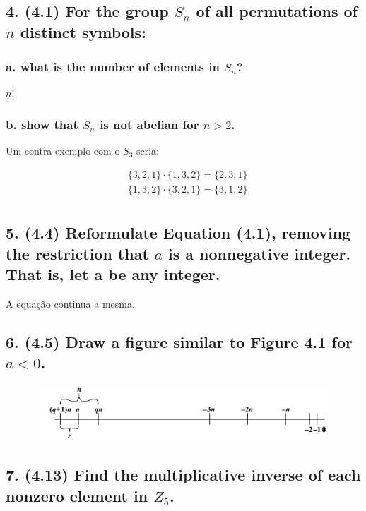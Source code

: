 \documentclass[fleqn, 12pt]{article}
\begin{document}
\subsection*{4. (4.1) For the group $S_n$ of all permutations of $n$ distinct
symbols:}
  \subsubsection*{a. what is the number of elements in $S_n$?}

    $n!$

  \subsubsection*{b. show that $S_n$ is not abelian for $n > 2$.}

    Um contra exemplo com o $S_3$ seria:

    \begin{align*}
      & \lbrace 3, 2, 1 \rbrace \cdot \lbrace 1, 3, 2 \rbrace = \lbrace 2, 3, 1
      \rbrace \\
      & \lbrace 1, 3, 2 \rbrace \cdot \lbrace 3, 2, 1 \rbrace = \lbrace 3, 1, 2
      \rbrace \\
    \end{align*}

\subsection*{5. (4.4) Reformulate Equation (4.1), removing the restriction that
$a$ is a nonnegative integer. That is, let a be any integer.}

    A equação continua a mesma.

\subsection*{6. (4.5) Draw a figure similar to Figure 4.1 for $a < 0$.}
  \begin{figure}[h]
    \includegraphics[width=\linewidth]{quatro_seis}
  \end{figure}

\subsection*{7. (4.13) Find the multiplicative inverse of each nonzero element
in $Z_5$.}
\end{document}
